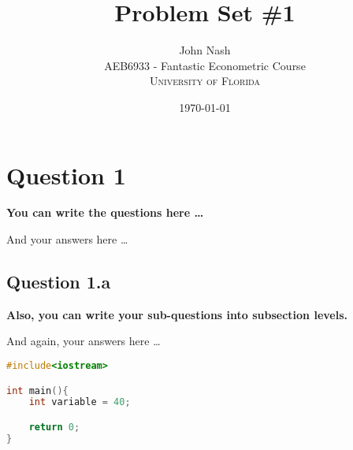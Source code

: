 \documentclass[12pt]{article}
\title{Problem Set \#1} %
\author{John Nash\\ %
AEB6933 - Fantastic Econometric Course\\ %
\textsc{University of Florida}
}
\date{\today} %
\begin{document}
\setlength{\droptitle}{-5em}    
\maketitle


\section*{Question 1}
{\bfseries You can write the questions here \ldots}

And your answers here \ldots

\subsection*{Question 1.a}
{\bfseries Also, you can write your sub-questions into subsection levels.}

And again, your answers here \ldots

\begin{lstlisting}[language = C]
#include<iostream>

int main(){
	int variable = 40;

	return 0;
}
\end{lstlisting}
\end{document}
